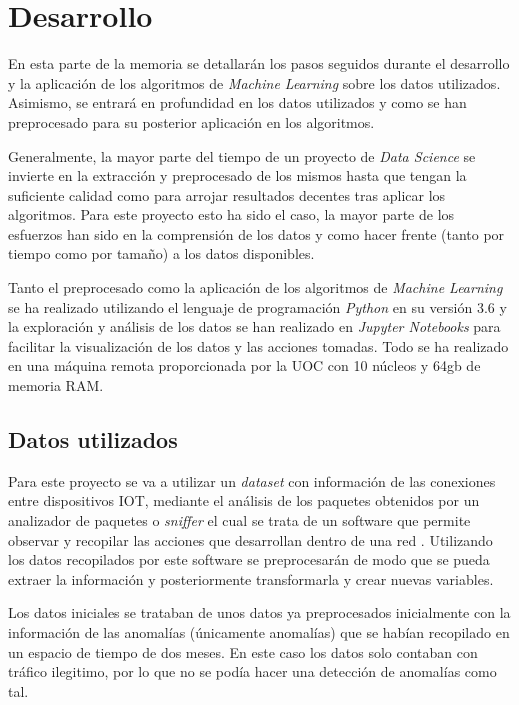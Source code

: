 \chapter{Desarrollo}
\label{chapter:Desarrollo}

En esta parte de la memoria se detallarán los pasos seguidos durante el desarrollo y la aplicación de los algoritmos de \textit{Machine Learning} sobre los datos utilizados. Asimismo, se entrará en profundidad en los datos utilizados y como se han preprocesado para su posterior aplicación en los algoritmos.

Generalmente, la mayor parte del tiempo de un proyecto de \textit{Data Science} se invierte en la extracción y preprocesado de los mismos hasta que tengan la suficiente calidad como para arrojar resultados decentes tras aplicar los algoritmos. Para este proyecto esto ha sido el caso, la mayor parte de los esfuerzos han sido en la comprensión de los datos y como hacer frente (tanto por tiempo como por tamaño) a los datos disponibles.

Tanto el preprocesado como la aplicación de los algoritmos de \textit{Machine Learning} se ha realizado utilizando el lenguaje de programación \textit{Python} en su versión 3.6 y la exploración y análisis de los datos se han realizado en \textit{Jupyter Notebooks} para facilitar la visualización de los datos y las acciones tomadas. Todo se ha realizado en una máquina remota proporcionada por la UOC con 10 núcleos y 64gb de memoria RAM.
\newpage

\section{Datos utilizados}

Para este proyecto se va a utilizar un \textit{dataset} con información de las conexiones entre dispositivos IOT, mediante el análisis de los paquetes obtenidos por un analizador de paquetes o \textit{sniffer} el cual se trata de un software que permite observar y recopilar las acciones que desarrollan dentro de una red \cite{sniffer}. Utilizando los datos recopilados por este software se preprocesarán de modo que se pueda extraer la información y posteriormente transformarla y crear nuevas variables.

Los datos iniciales se trataban de unos datos ya preprocesados inicialmente con la información de las anomalías (únicamente anomalías) que se habían recopilado en un espacio de tiempo de dos meses. En este caso los datos solo contaban con tráfico ilegitimo, por lo que no se podía hacer una detección de anomalías como tal.

